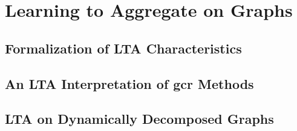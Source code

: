 \chapter{Learning to Aggregate on Graphs}%
\label{sec:ltag}

\section{Formalization of LTA Characteristics}%
\label{sec:ltag:formal}

\section{An LTA Interpretation of \ac{gcr} Methods}%
\label{sec:ltag:interpretation}

\section{LTA on Dynamically Decomposed Graphs}%
\label{sec:ltag:dyndecomp}

